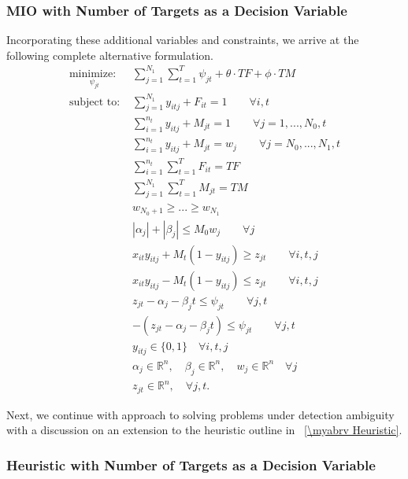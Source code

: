 \subsubsection{MIO with Number of Targets as a Decision Variable}
Incorporating these additional variables and constraints, we arrive at the following complete alternative formulation.
\begin{align}
\underset{\psi_{jt}}{\text{minimize: }} & \sum_{j=1}^{N_{1}} \sum_{t=1}^{T} \psi_{jt} + \theta \cdot TF + \phi \cdot TM\\
\text{subject to: }	& \sum_{j=1}^{N_{1}} y_{itj} + F_{it} = 1 \qquad \forall i,t \nonumber\\
				& \sum_{i=1}^{n_{t}} y_{itj} + M_{jt} = 1 \qquad \forall j=1,...,N_{0},t \nonumber \\
				& \sum_{i=1}^{n_{t}} y_{itj} + M_{jt} = w_{j} \qquad \forall j=N_{0},...,N_{1},t \nonumber \\
				& \sum_{i=1}^{n_{t}} \sum_{t=1}^{T} F_{it} = TF \nonumber \\
				& \sum_{j=1}^{N_{1}} \sum_{t=1}^{T} M_{jt} = TM \nonumber \\
				& w_{N_0+1}\geq ...\geq w_{N_1} \nonumber \\
				& |\alpha_{j}|+|\beta_{j}| \leq M_{0}w_{j}\qquad \forall j \nonumber \\
				& x_{it}y_{itj} + M_{t}(1-y_{itj}) \geq z_{jt} \qquad \forall i,t,j \nonumber \\
				& x_{it}y_{itj} - M_{t}(1-y_{itj}) \leq z_{jt} \qquad \forall i,t,j \nonumber \\
				& z_{jt} - \alpha_{j} - \beta_{j}t \leq \psi_{jt} \qquad \forall j,t \nonumber \\
				& -(z_{jt} - \alpha_{j} - \beta_{j}t) \leq \psi_{jt} \qquad \forall j,t \nonumber \\
			 	& y_{itj} \in \{0,1\} \quad \forall i,t,j \nonumber \\
				& \alpha_{j} \in \mathbb{R}^n,\quad \beta_{j} \in \mathbb{R}^n,\quad w_{j} \in \mathbb{R}^n \quad \forall j \nonumber \\
				& z_{jt} \in \mathbb{R}^n, \quad \forall j,t. \nonumber
\end{align}

Next, we continue with approach to solving problems under detection ambiguity with a discussion on an extension to the heuristic outline in \mysection~\ref{\myabrv Heuristic}. 

\subsubsection{Heuristic with Number of Targets as a Decision Variable}

